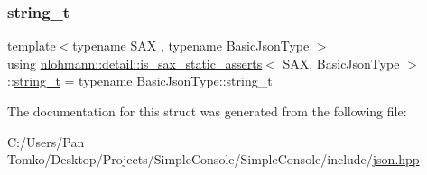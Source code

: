\subsubsection{\texorpdfstring{string\_t}{string\_t}}
{\footnotesize\ttfamily template$<$typename S\+AX , typename Basic\+Json\+Type $>$ \\
using \mbox{\hyperlink{structnlohmann_1_1detail_1_1is__sax__static__asserts}{nlohmann\+::detail\+::is\+\_\+sax\+\_\+static\+\_\+asserts}}$<$ S\+AX, Basic\+Json\+Type $>$\+::\mbox{\hyperlink{structnlohmann_1_1detail_1_1is__sax__static__asserts_a067c98d2145bb54d862f4794ac1287bb}{string\+\_\+t}} =  typename Basic\+Json\+Type\+::string\+\_\+t\hspace{0.3cm}{\ttfamily [private]}}



The documentation for this struct was generated from the following file\+:\begin{DoxyCompactItemize}
\item 
C\+:/\+Users/\+Pan Tomko/\+Desktop/\+Projects/\+Simple\+Console/\+Simple\+Console/include/\mbox{\hyperlink{json_8hpp}{json.\+hpp}}\end{DoxyCompactItemize}
